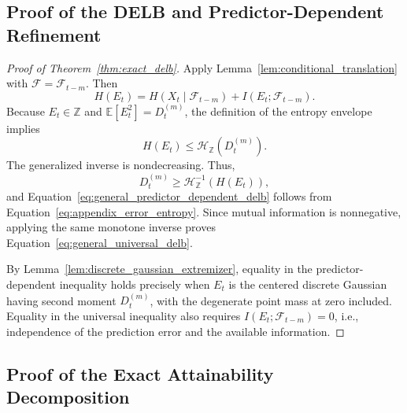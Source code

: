 \subsection{Proof of the DELB and Predictor-Dependent Refinement}

\begin{proof}[Proof of Theorem~\ref{thm:exact_delb}]
Apply Lemma~\ref{lem:conditional_translation} with
\(\mathcal{F}=\mathcal{F}_{t-m}\). Then
\begin{equation}
H(E_t)
=
H(X_t\mid\mathcal{F}_{t-m})
+
I(E_t;\mathcal{F}_{t-m}).
\label{eq:appendix_error_entropy}
\end{equation}
Because \(E_t\in\mathbb{Z}\) and
\(\mathbb{E}[E_t^2]=D_t^{(m)}\), the definition of the entropy envelope
implies
\[
H(E_t)\leq\mathcal{H}_{\mathbb{Z}}(D_t^{(m)}).
\]
The generalized inverse is nondecreasing. Thus,
\[
D_t^{(m)}
\geq
\mathcal{H}_{\mathbb{Z}}^{-1}\!\left(H(E_t)\right),
\]
and Equation~\eqref{eq:general_predictor_dependent_delb} follows from
Equation~\eqref{eq:appendix_error_entropy}. Since mutual information is
nonnegative, applying the same monotone inverse proves
Equation~\eqref{eq:general_universal_delb}.

By Lemma~\ref{lem:discrete_gaussian_extremizer}, equality in the
predictor-dependent inequality holds precisely when \(E_t\) is the centered
discrete Gaussian having second moment \(D_t^{(m)}\), with the degenerate
point mass at zero included. Equality in the universal inequality also
requires \(I(E_t;\mathcal{F}_{t-m})=0\), i.e., independence of the prediction
error and the available information.
\end{proof}

\subsection{Proof of the Exact Attainability Decomposition}

